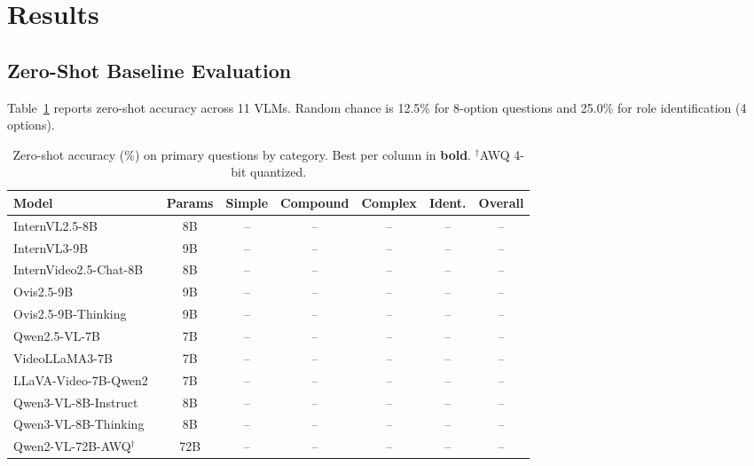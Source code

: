 \section{Results}

\subsection{Zero-Shot Baseline Evaluation}

Table~\ref{tab:baselines} reports zero-shot accuracy across 11 VLMs.
Random chance is 12.5\% for 8-option questions and 25.0\% for role
identification (4 options).

\begin{table}[t]
\centering
\caption{Zero-shot accuracy (\%) on primary questions by category.
Best per column in \textbf{bold}.
$^\dagger$AWQ 4-bit quantized.}
\label{tab:baselines}
\small
\begin{tabular}{lcccccc}
\toprule
Model & Params & Simple & Compound & Complex & Ident. & Overall \\
\midrule
InternVL2.5-8B~\cite{chen2024internvl25}            & 8B  & --   & --   & --   & --   & --   \\
InternVL3-9B~\cite{zhu2025internvl3}                & 9B  & --   & --   & --   & --   & --   \\
InternVideo2.5-Chat-8B~\cite{wang2025internvideo25}  & 8B  & --   & --   & --   & --   & --   \\
Ovis2.5-9B~\cite{lu2024ovis}                        & 9B  & --   & --   & --   & --   & --   \\
Ovis2.5-9B-Thinking~\cite{lu2024ovis}               & 9B  & --   & --   & --   & --   & --   \\
Qwen2.5-VL-7B~\cite{bai2025qwen25vl}                & 7B  & --   & --   & --   & --   & --   \\
VideoLLaMA3-7B~\cite{zhang2025videollama3}           & 7B  & --   & --   & --   & --   & --   \\
LLaVA-Video-7B-Qwen2~\cite{zhang2024llavavideo}      & 7B  & --   & --   & --   & --   & --   \\
Qwen3-VL-8B-Instruct~\cite{bai2025qwen3vl}          & 8B  & --   & --   & --   & --   & --   \\
Qwen3-VL-8B-Thinking~\cite{bai2025qwen3vl}          & 8B  & --   & --   & --   & --   & --   \\
Qwen2-VL-72B-AWQ$^\dagger$~\cite{wang2024qwen2vl}   & 72B & --   & --   & --   & --   & --   \\
\bottomrule
\end{tabular}
\end{table}


